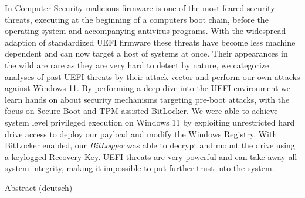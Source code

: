 

\label{sec:abstract}

In Computer Security malicious firmware is one of the most feared security threats, executing at the beginning of a computers boot chain, before the operating system and accompanying antivirus programs. With the widespread adaption of standardized \acs{UEFI} firmware these threats have become less machine dependent and can now target a host of systems at once.
Their appearances in the wild are rare as they are very hard to detect by nature, we categorize analyses of past UEFI threats by their attack vector and perform our own attacks against Windows 11.
By performing a deep-dive into the UEFI environment we learn hands on about security mechanisms targeting pre-boot attacks, with the focus on Secure Boot and TPM-assisted BitLocker.
We were able to achieve system level privileged execution on Windows 11 by exploiting unrestricted hard drive access to deploy our payload and modify the Windows Registry. With BitLocker enabled, our \emph{BitLogger} was able to decrypt and mount the drive using a keylogged Recovery Key.
UEFI threats are very powerful and can take away all system integrity, making it impossible to put further trust into the system.

\vspace*{20mm}

{Abstract (deutsch)}
\label{sec:abstract-diff}

\blindtext
